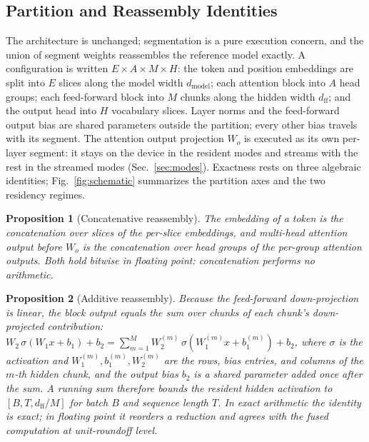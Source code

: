 \documentclass[journal]{IEEEtran}
\newtheorem{proposition}{Proposition}
\begin{document}
\subsection{Partition and Reassembly Identities}\label{sec:partition}
The architecture is unchanged; segmentation is a pure execution concern, and
the union of segment weights reassembles the reference model exactly. A
configuration is written $E{\times}A{\times}M{\times}H$: the token and
position embeddings are split into $E$ slices along the model width
$d_\text{model}$; each attention block into $A$ head groups; each feed-forward
block into $M$ chunks along the hidden width $d_\text{ff}$; and the output
head into $H$ vocabulary slices. Layer norms and the feed-forward output
bias are shared parameters outside the partition; every other bias travels
with its segment. The attention output projection $W_o$ is executed as
its own per-layer segment: it stays on the device in the resident modes and
streams with the rest in the streamed modes (Sec.~\ref{sec:modes}).
Exactness rests on three algebraic identities; Fig.~\ref{fig:schematic}
summarizes the partition axes and the two residency regimes.

\begin{proposition}[Concatenative reassembly]\label{prop:concat}
The embedding of a token is the concatenation over slices of the per-slice
embeddings, and multi-head attention output before $W_o$ is the concatenation
over head groups of the per-group attention outputs. Both hold \emph{bitwise}
in floating point: concatenation performs no arithmetic.
\end{proposition}

\begin{proposition}[Additive reassembly]\label{prop:sum}
Because the feed-forward down-projection is linear, the block output equals
the sum over chunks of each chunk's down-projected contribution:
$W_2\,\sigma(W_1 x + b_1) + b_2 = \sum_{m=1}^{M} W_2^{(m)}\,\sigma(W_1^{(m)} x + b_1^{(m)}) + b_2$,
where $\sigma$ is the activation and $W_1^{(m)}, b_1^{(m)}, W_2^{(m)}$ are
the rows, bias entries, and columns of the $m$-th hidden chunk, and the output bias $b_2$ is a shared
parameter added once after the sum. A running sum therefore bounds the resident hidden activation to
$[B,T,d_\text{ff}/M]$ for batch $B$ and sequence length $T$. In exact arithmetic the identity is exact; in floating
point it reorders a reduction and agrees with the fused computation at
unit-roundoff level.
\end{proposition}
\end{document}
